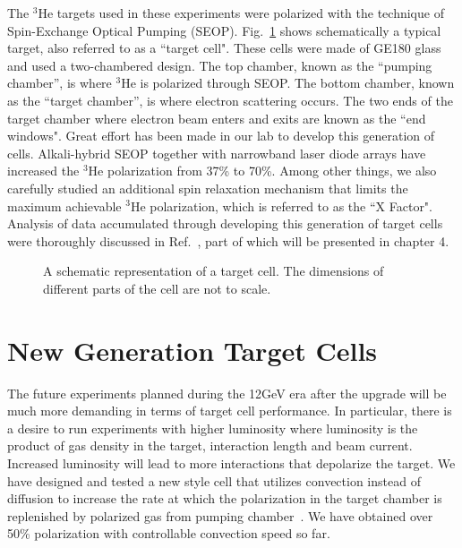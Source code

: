 The $^3$He targets used in these experiments were polarized with the technique of Spin-Exchange Optical Pumping (SEOP). Fig.~\ref{TargetCell} shows schematically a typical target, also referred to as a ``target cell". These cells were made of GE180 glass and used a two-chambered design. The top chamber, known as the “pumping chamber”, is where $^{3}$He is polarized through SEOP. The bottom chamber, known as the “target chamber”, is where electron scattering occurs. The two ends of the target chamber where electron beam enters and exits are known as the ``end windows". Great effort has been made in our lab to develop this generation of cells. Alkali-hybrid SEOP together with narrowband laser diode arrays have increased the $^{3}$He polarization from 37\% to 70\%. Among other things, we also carefully studied an additional spin relaxation mechanism that limits the maximum achievable $^{3}$He polarization, which is referred to as the ``X Factor". Analysis of data accumulated through developing this generation of target cells were thoroughly discussed in Ref.~\cite{PhysRevC.91.055205}, part of which will be presented in chapter 4. 

\begin{figure}[H]
	\centering
	\caption{{ A schematic representation of a target cell. The dimensions of different parts of the cell are not to scale.}}
	\label{TargetCell}
\end{figure}

\section{New Generation Target Cells}

The future experiments planned during the 12GeV era after the upgrade will be much more demanding in terms of target cell performance. In particular, there is a desire to run experiments with higher luminosity where luminosity is the product of gas density in the target, interaction length and beam current. Increased luminosity will lead to more interactions that depolarize the target. We have designed and tested a new style cell that utilizes convection instead of diffusion to increase the rate at which the polarization in the target chamber is replenished by polarized gas from pumping chamber~\cite{PhysRevC.84.065201}. We have obtained over 50\% polarization with controllable convection speed so far.

